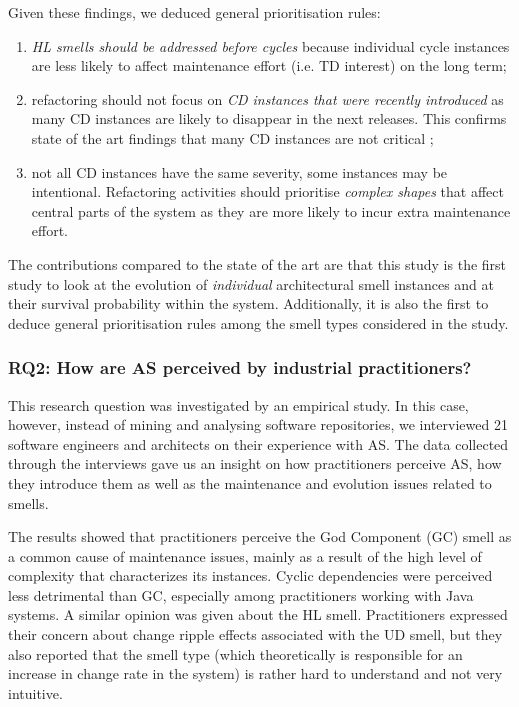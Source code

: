 Given these findings, we deduced general prioritisation rules:
\begin{enumerate}
\item \emph{HL smells should be addressed before cycles} because individual cycle instances are less likely to affect maintenance effort (i.e. TD interest) on the long term;
\item refactoring should not focus on \emph{CD instances that were recently introduced} as many CD instances are likely to disappear in the next releases. This confirms state of the art findings that many CD instances are not critical \cite{AlMutawa2014};
\item not all CD instances have the same severity, some instances may be intentional. Refactoring activities should prioritise \emph{complex shapes} that affect central parts of the system as they are more likely to incur extra maintenance effort.
\end{enumerate}

The contributions compared to the state of the art are that this study is the first study to look at the evolution of \emph{individual} architectural smell instances and at their survival probability within the system.
Additionally, it is also the first to deduce general prioritisation rules among the smell types considered in the study.

\subsubsection*{RQ2: How are AS perceived by industrial practitioners?}
This research question was investigated by an empirical study.
In this case, however, instead of mining and analysing software repositories, we interviewed 21 software engineers and architects on their experience with AS.
The data collected through the interviews gave us an insight on how practitioners perceive AS, how they introduce them as well as the maintenance and evolution issues related to smells. 

The results showed that practitioners perceive the God Component (GC) smell as a common cause of maintenance issues, mainly as a result of the high level of complexity that characterizes its instances. 
Cyclic dependencies were perceived less detrimental than GC, especially among practitioners working with Java systems. A similar opinion was given about the HL smell.
Practitioners expressed their concern about change ripple effects associated with the UD smell, but they also reported that the smell type (which theoretically is responsible for an increase in change rate in the system) is rather hard to understand and not very intuitive. 

